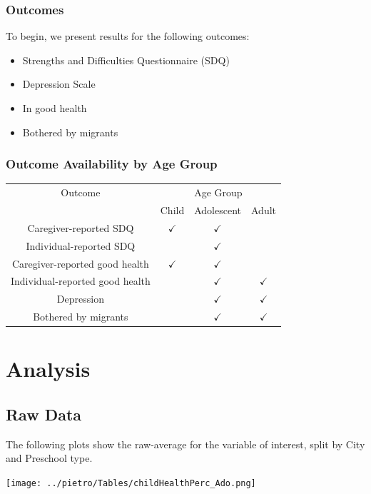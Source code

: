 \documentclass{beamer}
\begin{document}
\begin{frame}
	\frametitle{Outcomes}
	To begin, we present results for the following outcomes:
	\begin{itemize}
		\item Strengths and Difficulties Questionnaire (SDQ) 
		\item Depression Scale
		\item In good health
		\item Bothered by migrants
	\end{itemize}
\end{frame}


\begin{frame}
	\frametitle{Outcome Availability by Age Group}
	\centering
	\begin{tabular}{cccc}
	\toprule
	Outcome & \multicolumn{3}{c}{Age Group} \\ 
	\cmidrule{2-4}
	& Child & Adolescent & Adult \\
	\midrule
	Caregiver-reported SDQ & $\checkmark$ & $\checkmark$&  \\
	Individual-reported SDQ &  & $\checkmark$ &  \\
	\cmidrule{1-1}
	Caregiver-reported good health & $\checkmark$ & $\checkmark$ &  \\
	Individual-reported good health &  & $\checkmark$ & $\checkmark$ \\
	\cmidrule{1-1}
	Depression &  & $\checkmark$ & $\checkmark$ \\
	\cmidrule{1-1}
	Bothered by migrants & & $\checkmark$& $\checkmark$ \\
	\bottomrule
	\end{tabular}
\end{frame}


\section{Analysis}

\subsection{Raw Data}
\begin{frame}
The following plots show the raw-average for the variable of interest, split by City and Preschool type.
\end{frame}

\begin{frame}
\center
\texttt{[image: ../pietro/Tables/childHealthPerc\_Ado.png]}
\end{frame}
\end{document}
